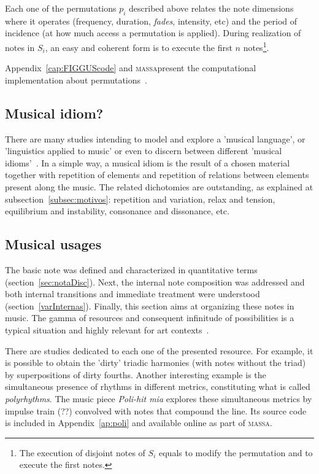 \documentclass[
 aip,
 jmp,
 amsmath,amssymb,
 reprint,
]{revtex4-1}
\newcommand{\massa}{{\large \textsc{massa}}}
\begin{document}
Each one of the permutations $p_i$ described above relates the note dimensions where it operates (frequency, duration, \emph{fades},
intensity, etc) and the period of incidence (at how much access a permutation is
applied). During realization of notes in $S_i$, an easy and coherent form is to
execute the first $n$ notes\footnote{The execution of disjoint notes of $S_i$
equals to modify the permutation and to execute the first notes.}.

Appendix~\ref{cap:FIGGUScode} and \massa present the computational implementation about permutations~\cite{MASSA,figgusOriginal,figgusEspacializacao}.

\subsection{Musical idiom?}

There are many studies intending to model and explore a 'musical language',
or 'linguistics applied to music' or even to discern between different 'musical
idioms'~\cite{Lerdahl, Harmonia, Salzer,Alfaix}. In a simple way, a musical idiom
is the result of a chosen material together with repetition of elements and
repetition of relations between elements present along the music. The related dichotomies are outstanding, as explained at subsection~\ref{subsec:motivos}: repetition and variation, relax and tension, equilibrium and instability, consonance and dissonance, etc.

\subsection{Musical usages}\label{subsec:usosmusicais3}

The basic note was defined and characterized in quantitative terms (section~\ref{sec:notaDisc}). Next, the internal note
composition was addressed and both internal transitions and immediate treatment
were understood (section~\ref{varInternas}). Finally, this section aims at
organizing these notes in music. The gamma of resources and consequent infinitude
of possibilities is a typical situation and highly relevant for art contexts~\cite{Harmonia,Webern}.

There are studies dedicated to each one of the presented resource. For example, it is possible to obtain the 'dirty' triadic harmonies (with notes without the triad) by
superpositions of dirty fourths. Another interesting example is the simultaneous
presence of rhythms in different metrics, constituting what is
called \emph{polyrhythms}. The music piece \emph{Poli-hit mia} explores these
simultaneous metrics by impulse train (??) convolved with notes that compound the
line. Its source code is included in Appendix~\ref{ap:poli} and available online as part
of \massa.
\end{document}
